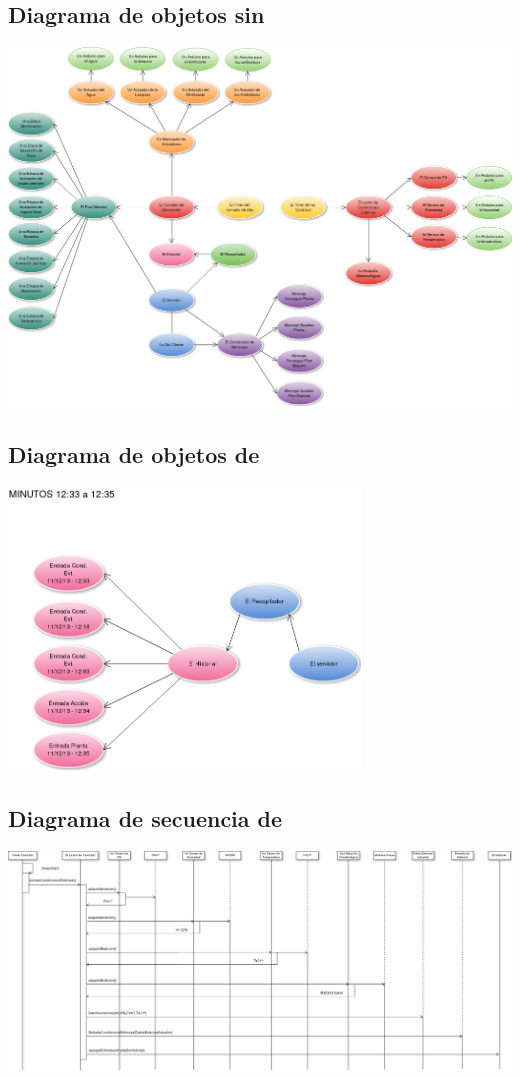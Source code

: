 \begin{landscape}
    \subsection{Diagrama de objetos sin \historial{}}
        \includegraphics[width=1.2\textwidth]{img/objetosGeneral.png}
    \newpage

    \subsection{Diagrama de objetos de \historial{}}
        \includegraphics[width=0.7\textwidth]{img/objetosHistorial.png}
    \newpage

    \subsection{Diagrama de secuencia de \condiciones{}}
        \includegraphics[width=1.3\textwidth]{img/condicionesExternas.png}
    \newpage


\end{landscape}
